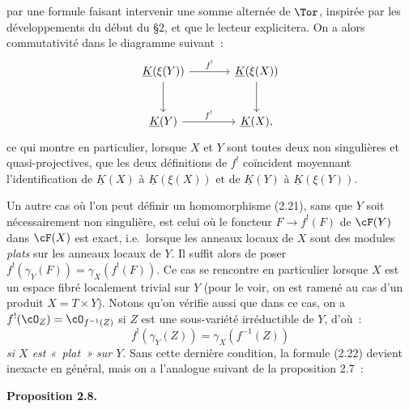 par une
formule faisant intervenir une somme alternée de $\Tor$, inspirée par les développements du début du \S 2, et que le lecteur explicitera. On a alors commutativité dans le diagramme suivant~:
\[
\begin{tikzcd}[column sep=large,row sep=large]
\underline K(\xi(Y)) \arrow[r,"f^!"] \arrow[d] & \underline K(\xi(X)) \arrow[d]\\
\underline K(Y) \arrow[r,"f^!"] & \underline K(X){,}
\end{tikzcd}
\]
ce qui montre en particulier, lorsque $X$ et $Y$ sont toutes deux non singulières et quasi-projectives, que les deux définitions de $f^!$ coïncident moyennant l'identification de $\underline K(X)$ à $\underline K(\xi(X))$ et de $\underline K(Y)$ à $\underline K(\xi(Y))$.

Un autre cas où l'on peut définir un homomorphisme (2.21), sans que $Y$ soit nécessairement non singulière, est celui où le foncteur $F\to f^!(F)$ de $\cF(Y)$ dans $\cF(X)$ est exact, i.e.\ lorsque les anneaux locaux de $X$ sont des modules \emph{plats} sur les anneaux locaux de $Y$. Il suffit alors de poser $f^!(\gamma_Y(F))=\gamma_X(f^!(F))$.
Ce cas se rencontre en particulier lorsque $X$ est un espace fibré localement trivial sur $Y$ (pour le voir, on est ramené au cas d'un produit $X=T\times Y$). Notons qu'on vérifie aussi que dans ce cas, on a $f^!(\cO_Z)=\cO_{f^{-1}(Z)}$ si $Z$ est une sous-variété irréductible de $Y$, d'où~:
\begin{equation}\tag{2.22}
 f^!(\gamma_Y(Z))=\gamma_X(f^{-1}(Z))
\end{equation}
\emph{si $X$ est «~plat~» sur $Y$}. Sans cette dernière condition, la formule (2.22) devient inexacte en général, mais on a l'analogue suivant de la proposition 2.7~:

\textbf{Proposition 2.8.}
